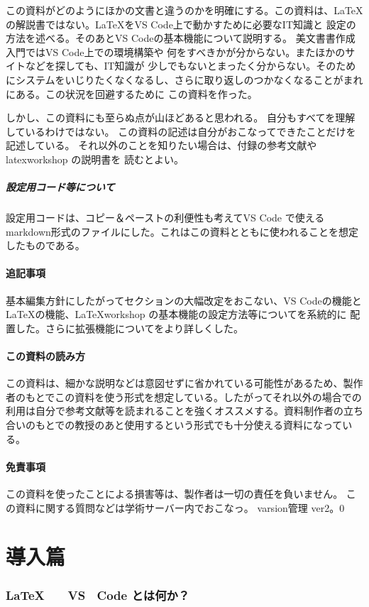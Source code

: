 \documentclass{ltjsarticle}
\begin{document}
この資料がどのようにほかの文書と違うのかを明確にする。この資料は、\LaTeX
の解説書ではない。\LaTeX をVS Code上で動かすために必要なIT知識と
設定の方法を述べる。そのあとVS Codeの基本機能について説明する。
美文書書作成入門\cite{美文書本}ではVS Code上での環境構築や
何をすべきかが分からない。またほかのサイトなどを探しても、IT知識が
少しでもないとまったく分からない。そのためにシステムをいじりたくなくなるし、さらに取り返しのつかなくなることがまれにある。この状況を回避するために
この資料を作った。

しかし、この資料にも至らぬ点が山ほどあると思われる。
自分もすべてを理解しているわけではない。
この資料の記述は自分がおこなってできたことだけを記述している。
それ以外のことを知りたい場合は、付録の参考文献やlatexworkshop の説明書を
読むとよい。
\subsubsection{設定用コード等について}
設定用コードは、コピー＆ペーストの利便性も考えてVS Code で使えるmarkdown形式のファイルにした。これはこの資料とともに使われることを想定したものである。
\subsection{追記事項}
基本編集方針にしたがってセクションの大幅改定をおこない、VS Codeの機能と
LaTeXの機能、LaTeXworkshop の基本機能の設定方法等についてを系統的に
配置した。さらに拡張機能についてをより詳しくした。
\subsection{この資料の読み方}
この資料は、細かな説明などは意図せずに省かれている可能性があるため、製作者のもとでこの資料を使う形式を想定している。したがってそれ以外の場合での利用は自分で参考文献等を読まれることを強くオススメする。資料制作者の立ち合いのもとでの教授のあと使用するという形式でも十分使える資料になっている。
\subsection{免責事項}
この資料を使ったことによる損害等は、製作者は一切の責任を負いません。
この資料に関する質問などは学術サーバー内でおこなっ。
varsion管理  ver2。0
\tableofcontents
\part{導入篇}
\section{\LaTeX　　VS　Code とは何か？}
\end{document}
